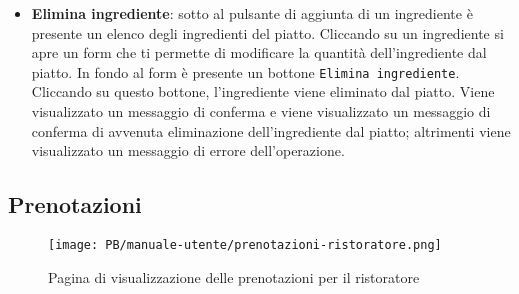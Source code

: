 \begin{itemize}
	\item \textbf{Elimina ingrediente}: sotto al pulsante di aggiunta di un
		ingrediente è presente un elenco degli ingredienti del piatto. Cliccando
		su un ingrediente si apre un form che ti permette di modificare la
		quantità dell'ingrediente dal piatto. In fondo al form è presente un
		bottone \texttt{Elimina ingrediente}. Cliccando su questo bottone,
		l'ingrediente viene eliminato dal piatto. Viene visualizzato un messaggio
		di conferma e viene visualizzato un messaggio di conferma di avvenuta
		eliminazione dell'ingrediente dal piatto; altrimenti viene visualizzato
		un messaggio di errore dell'operazione.
\end{itemize}

\subsection{Prenotazioni}

\begin{figure}[htbp]
    \centering
	\texttt{[image: PB/manuale-utente/prenotazioni-ristoratore.png]}
	\caption{Pagina di visualizzazione delle prenotazioni per il ristoratore}
\end{figure}

